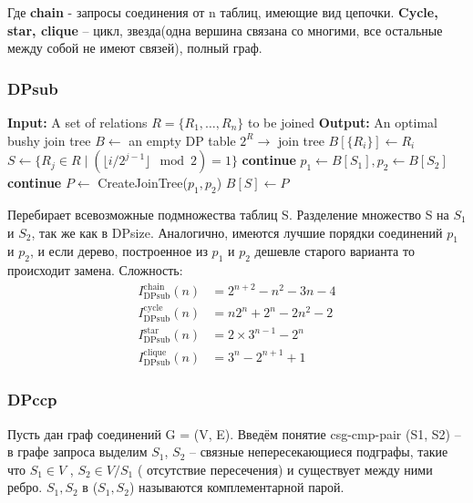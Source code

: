 \documentclass[12pt]{article}
\begin{document}
\begin{flushleft}
Где \textbf{chain} - запросы соединения от n таблиц, имеющие вид цепочки. 
\textbf{Cycle, star, clique} -- цикл, звезда(одна вершина связана со многими, все остальные
между собой не имеют связей), полный граф.
\centering \subsubsection*{DPsub \cite[стр. 158]{Thomas}} 
\raggedright
\begin{algorithm}[H]
    \begin{algorithmic}[1]
        \State \textbf{Input:} A set of relations $R = \{R_1, \dots, R_n\}$ to be joined
        \State \textbf{Output:} An optimal bushy join tree
        \State $B \gets$ an empty DP table $2^R \to$ join tree
            \State $B[\{R_i\}] \gets R_i$
        \EndFor
            \State $S \gets \{ R_j \in R \mid ( \lfloor i / 2^{j-1} \rfloor \mod 2) = 1 \}$
                    \State \textbf{continue}
                \EndIf
                \State $p_1 \gets B[S_1], p_2 \gets B[S_2]$
                 \textbf{continue} \EndIf
                \State $P \gets$ CreateJoinTree($p_1, p_2$)
                    \State $B[S] \gets P$
                \EndIf
            \EndFor
        \EndFor
    \end{algorithmic}
\end{algorithm}
Перебирает всевозможные подмножества таблиц S. Разделение множество S на  $S_1$ и $S_2$, 
так же как в DPsize. Аналогично, имеются лучшие порядки соединений $p_1$ и $p_2$, 
и если дерево, построенное из $p_1$ и $p_2$ дешевле старого варианта то происходит 
замена. Сложность:
\begin{align*}
    I^{\text{chain}}_{\text{DPsub}}(n) &= 2^{n+2} - n^{2} - 3n - 4 \\
    I^{\text{cycle}}_{\text{DPsub}}(n) &= n2^{n} + 2^{n} - 2n^2 - 2 \\
    I^{\text{star}}_{\text{DPsub}}(n) &= 2 \times 3^{n-1} - 2^{n} \\
    I^{\text{clique}}_{\text{DPsub}}(n) &= 3^n - 2^{n+1} + 1
\end{align*}
\centering \subsubsection*{DPccp \cite[стр. 168]{Thomas} \cite{Moerkotte}}
\raggedright
Пусть дан граф соединений G = (V, E).
Введём понятие csg-cmp-pair (S1, S2) -- в графе запроса выделим $S_1$, 
$S_2$ -- связные непересекающиеся подграфы, такие что $S_1 \in V$ , 
$S_2 \in V/S_1$ ( отсутствие пересечения) и существует между ними ребро. 
$S_1, S_2$ в ($S_1,S_2$) называются комплементарной парой.
\newline


\end{flushleft}
\end{document}
